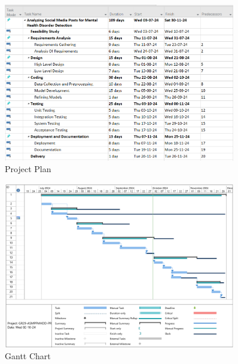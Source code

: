 \begin{figure}[h!]  
    \centering
    \includegraphics[width=0.9\textwidth]{Images/MS Project Plan Sem 7.png}  
    \caption{Project Plan}
    \label{Project Plan}  %
\end{figure}

\vspace{2cm}

\begin{figure}[h!]  
    \centering
    \includegraphics[width=0.9\textwidth]{Images/Gantt Chart.png}  
    \caption{Gantt Chart}
    \label{Gantt Chart}  %
\end{figure}

